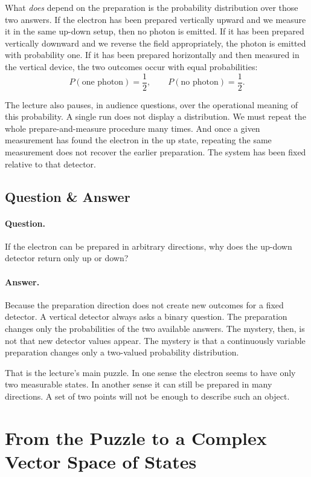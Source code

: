 What \emph{does} depend on the preparation is the probability distribution over those two answers. If the electron has been prepared vertically upward and we measure it in the same up-down setup, then no photon is emitted. If it has been prepared vertically downward and we reverse the field appropriately, the photon is emitted with probability one. If it has been prepared horizontally and then measured in the vertical device, the two outcomes occur with equal probabilities:
\begin{equation}
P(\text{one photon})=\frac{1}{2},
\qquad
P(\text{no photon})=\frac{1}{2}.
\end{equation}

The lecture also pauses, in audience questions, over the operational meaning of this probability. A single run does not display a distribution. We must repeat the whole prepare-and-measure procedure many times. And once a given measurement has found the electron in the up state, repeating the same measurement does not recover the earlier preparation. The system has been fixed relative to that detector.

\subsection{Question \& Answer}

\paragraph{Question.} If the electron can be prepared in arbitrary directions, why does the up-down detector return only up or down?

\paragraph{Answer.} Because the preparation direction does not create new outcomes for a fixed detector. A vertical detector always asks a binary question. The preparation changes only the probabilities of the two available answers. The mystery, then, is not that new detector values appear. The mystery is that a continuously variable preparation changes only a two-valued probability distribution.

That is the lecture's main puzzle. In one sense the electron seems to have only two measurable states. In another sense it can still be prepared in many directions. A set of two points will not be enough to describe such an object.

\section{From the Puzzle to a Complex Vector Space of States}

